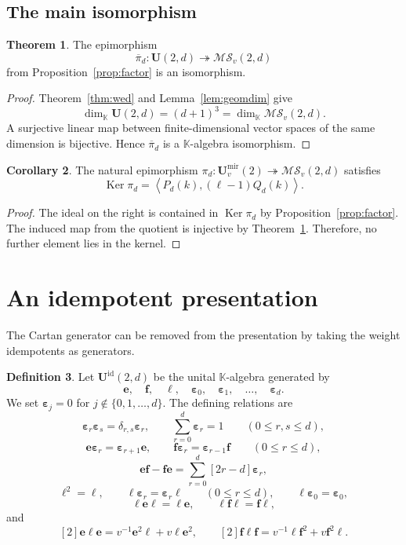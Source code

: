 \documentclass[12pt]{amsart}
\numberwithin{equation}{section}
\theoremstyle{definition}
\newtheorem{theorem}{Theorem}[section]
\newtheorem{corollary}[theorem]{Corollary}
\theoremstyle{definition}
\newtheorem{definition}[theorem]{Definition}
\newcommand{\kk}{\mathbb K}
\newcommand{\Umir}{\mathbf U^{\mathrm{mir}}_v(2)}
\newcommand{\Ufd}{\mathbf U(2,d)}
\newcommand{\MS}{\mathcal{MS}_v(2,d)}
\newcommand{\Ker}{\operatorname{Ker}}
\newcommand{\be}{\boldsymbol e}
\newcommand{\bfm}{\boldsymbol f}
\newcommand{\bell}{\boldsymbol\ell}
\newcommand{\beps}{\boldsymbol\varepsilon}
\begin{document}
\subsection{The main isomorphism}\label{subsec:isom}

\begin{theorem}\label{thm:mainiso}
The epimorphism
$$
\overline\pi_d:\Ufd\twoheadrightarrow\MS
$$
from Proposition~\ref{prop:factor} is an isomorphism.
\end{theorem}

\begin{proof}
Theorem~\ref{thm:wed} and Lemma~\ref{lem:geomdim} give
$$
\dim_{\kk}\Ufd=(d+1)^3=\dim_{\kk}\MS.
$$
A surjective linear map between finite-dimensional vector spaces of the same dimension is bijective. Hence $\overline\pi_d$ is a $\kk$-algebra isomorphism.
\end{proof}

\begin{corollary}\label{cor:kernel}
The natural epimorphism $\pi_d:\Umir\twoheadrightarrow\MS$ satisfies
$$
\Ker\pi_d=
\left\langle P_d(k),(\ell-1)Q_d(k)\right\rangle.
$$
\end{corollary}

\begin{proof}
The ideal on the right is contained in $\Ker\pi_d$ by Proposition~\ref{prop:factor}. The induced map from the quotient is injective by Theorem~\ref{thm:mainiso}. Therefore, no further element lies in the kernel.
\end{proof}


\section{An idempotent presentation}\label{sec:idemp}
The Cartan generator can be removed from the presentation by taking the weight idempotents as generators.

\begin{definition}\label{def:idemp}
Let $\mathbf U^{\mathrm{id}}(2,d)$ be the unital $\kk$-algebra generated by
$$
\be,\quad\bfm,\quad\bell,\quad
\beps_0,\quad\beps_1,\quad\ldots,\quad\beps_d.
$$
We set $\beps_j=0$ for $j\notin\{0,1,\ldots,d\}$. The defining relations are
$$
\beps_r\beps_s=\delta_{r,s}\beps_r,
\qquad
\sum_{r=0}^{d}\beps_r=1
\qquad(0\le r,s\le d),
$$
$$
\be\beps_r=\beps_{r+1}\be,
\qquad
\bfm\beps_r=\beps_{r-1}\bfm
\qquad(0\le r\le d),
$$
$$
\be\bfm-\bfm\be
=\sum_{r=0}^{d}[2r-d]\beps_r,
$$
$$
\bell^2=\bell,
\qquad
\bell\beps_r=\beps_r\bell
\qquad(0\le r\le d),
\qquad
\bell\beps_0=\beps_0,
$$
$$
\bell\be\bell=\bell\be,
\qquad
\bell\bfm\bell=\bfm\bell,
$$
and
$$
[2]\be\bell\be
=v^{-1}\be^2\bell+v\bell\be^2,\qquad [2]\bfm\bell\bfm
=v^{-1}\bell\bfm^2+v\bfm^2\bell.
$$
\end{definition}
\end{document}
